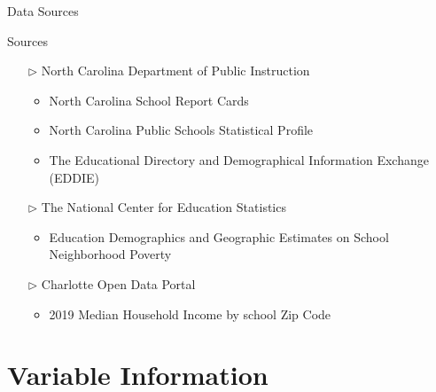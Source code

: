 \documentclass[10pt]{beamer}
\begin{document}
\begin{frame}{Data Sources}
    \fontsize{11pt}{7.2}
    \begin{exampleblock}{Sources}
        \begin{itemize}
            \setlength\itemsep{3mm}
            \item[$\triangleright$] North Carolina Department of Public Instruction
                \begin{itemize}
                    \item North Carolina School Report Cards
                    \item North Carolina Public Schools Statistical Profile
                    \item The Educational Directory and Demographical Information Exchange (EDDIE)
                \end{itemize}
            \item[$\triangleright$] The National Center for Education Statistics 
                \begin{itemize}
                    \item Education Demographics and Geographic Estimates on School Neighborhood Poverty
                \end{itemize}
            \item[$\triangleright$] Charlotte Open Data Portal
                \begin{itemize}
                    \item 2019 Median Household Income by school Zip Code
                \end{itemize}
        \end{itemize}
    \end{exampleblock}

\end{frame}


\section[Variable Information]{Variable Information}
\end{document}
